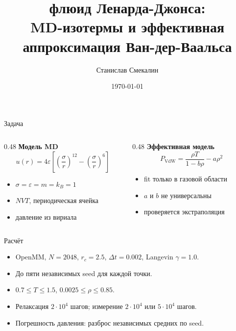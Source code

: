 \documentclass[aspectratio=169,11pt]{beamer}
\title[MD LJ-флюида и Ван-дер-Ваальс]{флюид Ленарда-Джонса:\\MD-изотермы и эффективная аппроксимация Ван-дер-Ваальса}
\author{Станислав Смекалин}
\institute{МФТИ, Б02-507}
\date{\today}
\begin{document}
\begin{frame}
    \titlepage
\end{frame}

\begin{frame}{Задача}
    \begin{columns}[T]
        \begin{column}{0.48\textwidth}
            \textbf{Модель MD}
            \[
            u(r)=4\varepsilon\left[\left(\frac{\sigma}{r}\right)^{12}
            -\left(\frac{\sigma}{r}\right)^6\right]
            \]
            \begin{itemize}
                \item $\sigma=\varepsilon=m=k_B=1$
                \item $NVT$, периодическая ячейка
                \item давление из вириала
            \end{itemize}
        \end{column}
        \begin{column}{0.48\textwidth}
            \textbf{Эффективная модель}
            \[
            P_{\mathrm{VdW}}=\frac{\rho T}{1-b\rho}-a\rho^2
            \]
            \begin{itemize}
                \item fit только в газовой области
                \item $a$ и $b$ не универсальны
                \item проверяется экстраполяция
            \end{itemize}
        \end{column}
    \end{columns}
\end{frame}

\begin{frame}{Расчёт}
    \begin{itemize}
        \item OpenMM, $N=2048$, $r_c=2.5$, $\Delta t=0.002$, Langevin $\gamma=1.0$.
        \item До пяти независимых seed для каждой точки.
        \item $0.7\leq T\leq1.5$, $0.0025\leq\rho\leq0.85$.
        \item Релаксация $2\cdot10^4$ шагов; измерение $2\cdot10^4$ или $5\cdot10^4$ шагов.
        \item Погрешность давления: разброс независимых средних по seed.
    \end{itemize}
\end{frame}
\end{document}
